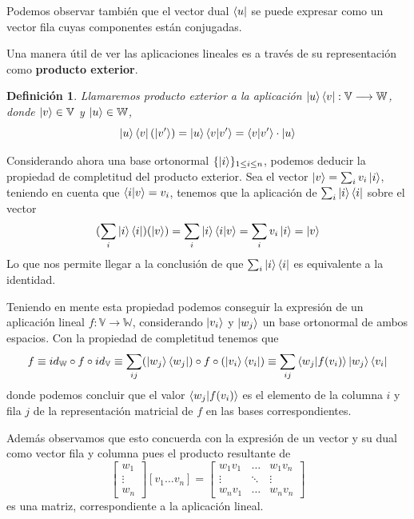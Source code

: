 \documentclass[a4paper]{article}
\newtheorem{deff}{Definición}[section]
\numberwithin{equation}{section}
\begin{document}
Podemos observar también que el vector dual $\bra{u}$ se puede expresar como un vector fila cuyas componentes están conjugadas.

Una manera útil de ver las aplicaciones lineales es a través de su representación como \textbf{producto exterior}.

\begin{deff}Llamaremos producto exterior a la aplicación $\ket{u}\bra{v}: \mathbb{V} \longrightarrow \mathbb{W}$, donde $\ket{v} \in \mathbb{V}$ y $\ket{u} \in \mathbb{W}$,
\begin{equation}
\ket{u}\bra{v}(\ket{v'}) = \ket{u}\braket{v|v'} = \braket{v|v'} \cdot \ket{u}
\end{equation}
\end{deff}

Considerando ahora una base ortonormal $\{\ket{i}\}_{1\leq i\leq n}$, podemos deducir la propiedad de completitud del producto exterior. Sea el vector $\ket{v} = \sum_i v_i\ket{i}$, teniendo en cuenta que $\braket{i|v} = v_i$, tenemos que la aplicación de $\sum_i \ket{i}\bra{i}$ sobre el vector
\begin{equation}
(\sum_i \ket{i}\bra{i}) (\ket{v}) = \sum_i \ket{i}\braket{i|v} = \sum_i v_i \ket{i} = \ket{v}
\end{equation}
Lo que nos permite llegar a la conclusión de que $\sum_i \ket{i}\bra{i}$ es equivalente a la identidad.

Teniendo en mente esta propiedad podemos conseguir la expresión de un aplicación lineal $f: \mathbb{V} \longrightarrow \mathbb{W}$, considerando $\ket{v_i}$ y $\ket{w_j}$ un base ortonormal de ambos espacios. Con la propiedad de completitud tenemos que
\begin{equation}
f \equiv id_{\mathbb{W}} \circ f \circ id_{\mathbb{V}} \equiv
\sum_{ij} (\ket{w_j}\bra{w_j}) \circ f \circ (\ket{v_i}\bra{v_i}) \equiv \sum_{ij} \braket{w_j|f(v_i)} \ket{w_j}\bra{v_i}
\end{equation}
donde podemos concluir que el valor $\braket{w_j|f(v_i)}$ es el elemento de la columna $i$ y fila $j$ de la representación matricial de $f$ en las bases correspondientes.

Además observamos que esto concuerda con la expresión de un vector y su dual como vector fila y columna pues el producto resultante de
\begin{equation}
\begin{bmatrix}
w_1 \\ \vdots \\ w_n
\end{bmatrix}
\left[ v_1 \ldots v_n \right]
= \begin{bmatrix}
w_1 v_1 & \ldots & w_1 v_n \\
\vdots & \ddots & \vdots \\
w_n v_1 & \ldots & w_n v_n
\end{bmatrix}
\end{equation} es una matriz, correspondiente a la aplicación lineal.
\end{document}
